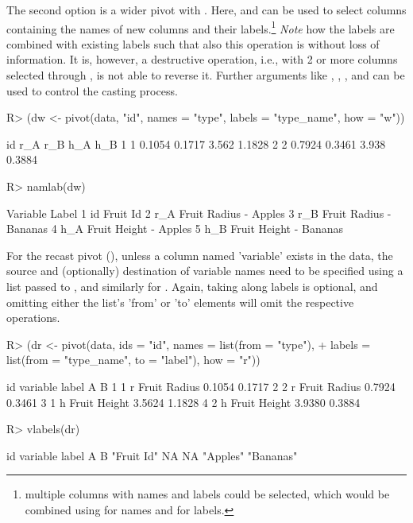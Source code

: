 \documentclass[article]{jss}
\newcommand{\fct}[1]{\code{#1()}}
\begin{document}
The second option is a wider pivot with . Here,  and  can be used to select columns containing the names of new columns and their labels.\footnote{multiple columns with names and labels could be selected, which would be combined using  for names and  for labels.} \emph{Note} how the labels are combined with existing labels such that also this operation is without loss of information. It is, however, a destructive operation, i.e., with 2 or more columns selected through , \fct{pivot} is not able to reverse it. Further arguments like , , , and  can be used to control the casting process.
%
\begin{Schunk}
\begin{Sinput}
R> (dw <- pivot(data, "id", names = "type", labels = "type_name", how = "w"))
\end{Sinput}
\begin{Soutput}
  id    r_A    r_B   h_A    h_B
1  1 0.1054 0.1717 3.562 1.1828
2  2 0.7924 0.3461 3.938 0.3884
\end{Soutput}
\begin{Sinput}
R> namlab(dw)
\end{Sinput}
\begin{Soutput}
  Variable                  Label
1       id               Fruit Id
2      r_A  Fruit Radius - Apples
3      r_B Fruit Radius - Bananas
4      h_A  Fruit Height - Apples
5      h_B Fruit Height - Bananas
\end{Soutput}
\end{Schunk}
%
For the recast pivot (), unless a column named 'variable' exists in the data, the source and (optionally) destination of variable names need to be specified using a list passed to , and similarly for . Again, taking along labels is optional, and omitting either the list's 'from' or 'to' elements will omit the respective operations.
%
\begin{Schunk}
\begin{Sinput}
R> (dr <- pivot(data, ids = "id", names = list(from = "type"),
+               labels = list(from = "type_name", to = "label"), how = "r"))
\end{Sinput}
\begin{Soutput}
  id variable        label      A      B
1  1        r Fruit Radius 0.1054 0.1717
2  2        r Fruit Radius 0.7924 0.3461
3  1        h Fruit Height 3.5624 1.1828
4  2        h Fruit Height 3.9380 0.3884
\end{Soutput}
\begin{Sinput}
R> vlabels(dr)
\end{Sinput}
\begin{Soutput}
        id   variable      label          A          B 
"Fruit Id"         NA         NA   "Apples"  "Bananas" 
\end{Soutput}
\end{Schunk}
\end{document}
